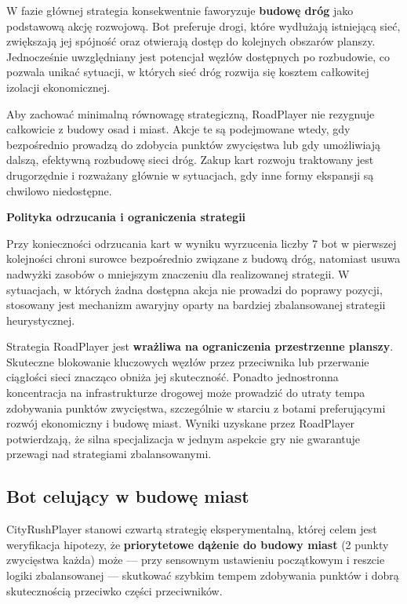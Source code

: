 \documentclass[polish,inz,longabstract]{iithesis}
\begin{document}
W fazie głównej strategia konsekwentnie faworyzuje \textbf{budowę dróg} jako podstawową akcję rozwojową. Bot preferuje drogi, które wydłużają istniejącą sieć, zwiększają jej spójność oraz otwierają dostęp do kolejnych obszarów planszy. Jednocześnie uwzględniany jest potencjał węzłów dostępnych po rozbudowie, co pozwala unikać sytuacji, w których sieć dróg rozwija się kosztem całkowitej izolacji ekonomicznej.

Aby zachować minimalną równowagę strategiczną, RoadPlayer nie rezygnuje całkowicie z budowy osad i miast. Akcje te są podejmowane wtedy, gdy bezpośrednio prowadzą do zdobycia punktów zwycięstwa lub gdy umożliwiają dalszą, efektywną rozbudowę sieci dróg. Zakup kart rozwoju traktowany jest drugorzędnie i rozważany głównie w sytuacjach, gdy inne formy ekspansji są chwilowo niedostępne.

\medskip
\textbf{Polityka odrzucania i ograniczenia strategii}

Przy konieczności odrzucania kart w wyniku wyrzucenia liczby 7 bot w pierwszej kolejności chroni surowce bezpośrednio związane z budową dróg, natomiast usuwa nadwyżki zasobów o mniejszym znaczeniu dla realizowanej strategii. W sytuacjach, w których żadna dostępna akcja nie prowadzi do poprawy pozycji, stosowany jest mechanizm awaryjny oparty na bardziej zbalansowanej strategii heurystycznej.

Strategia RoadPlayer jest \textbf{wrażliwa na ograniczenia przestrzenne planszy}. Skuteczne blokowanie kluczowych węzłów przez przeciwnika lub przerwanie ciągłości sieci znacząco obniża jej skuteczność. Ponadto jednostronna koncentracja na infrastrukturze drogowej może prowadzić do utraty tempa zdobywania punktów zwycięstwa, szczególnie w starciu z botami preferującymi rozwój ekonomiczny i budowę miast. Wyniki uzyskane przez RoadPlayer potwierdzają, że silna specjalizacja w jednym aspekcie gry nie gwarantuje przewagi nad strategiami zbalansowanymi.

\subsection{Bot celujący w budowę miast}
\label{sec:cityrushplayer}

CityRushPlayer stanowi czwartą strategię eksperymentalną, której celem jest weryfikacja hipotezy, że \textbf{priorytetowe dążenie do budowy miast} (2 punkty zwycięstwa każda) może --- przy sensownym ustawieniu początkowym i reszcie logiki zbalansowanej --- skutkować szybkim tempem zdobywania punktów i dobrą skutecznością przeciwko części przeciwników.
\end{document}
